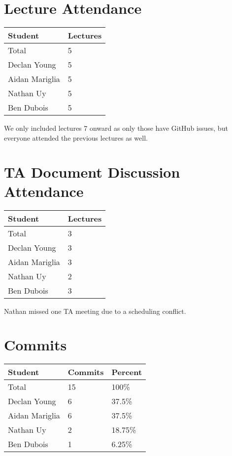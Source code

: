 \documentclass{article}
\begin{document}
\section{Lecture Attendance}

\begin{table}[H]
\centering
\begin{tabular}{ll}
\toprule
\textbf{Student} & \textbf{Lectures}\\
\midrule
Total & 5\\
Declan Young & 5\\
Aidan Mariglia & 5\\
Nathan Uy & 5\\
Ben Dubois & 5\\
\bottomrule
\end{tabular}
\end{table}

We only included lectures 7 onward as only those have GitHub issues, but everyone attended the previous lectures as well.

\section{TA Document Discussion Attendance}

\begin{table}[H]
\centering
\begin{tabular}{ll}
\toprule
\textbf{Student} & \textbf{Lectures}\\
\midrule
Total & 3\\
Declan Young & 3\\
Aidan Mariglia & 3\\
Nathan Uy & 2\\
Ben Dubois & 3\\
\bottomrule
\end{tabular}
\end{table}

Nathan missed one TA meeting due to a scheduling conflict.

\section{Commits}

\begin{table}[H]
\centering
\begin{tabular}{lll}
\toprule
\textbf{Student} & \textbf{Commits} & \textbf{Percent}\\
\midrule
Total & 15 & 100\% \\
Declan Young & 6 & 37.5\% \\
Aidan Mariglia & 6 & 37.5\% \\
Nathan Uy & 2 & 18.75\% \\
Ben Dubois & 1 & 6.25\% \\
\bottomrule
\end{tabular}
\end{table}
\end{document}
